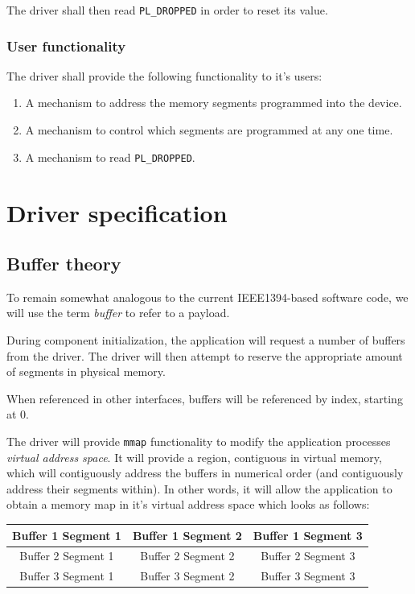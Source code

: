 \documentclass[12pt]{article}
\begin{document}
The driver shall then read \texttt{PL\_DROPPED} in order to reset its value.

\subsubsection{User functionality}

The driver shall provide the following functionality to it's users:

\begin{enumerate}
\item A mechanism to address the memory segments programmed into the device.
\item A mechanism to control which segments are programmed at any one time.
\item A mechanism to read \texttt{PL\_DROPPED}.
\end{enumerate}

\section{Driver specification}

\subsection{Buffer theory}

To remain somewhat analogous to the current IEEE1394-based software code, we will use the term \textit{buffer} to refer to a payload.

During component initialization, the application will request a number of buffers from the driver. The driver will then attempt to reserve the appropriate amount of segments in physical memory.

When referenced in other interfaces, buffers will be referenced by index, starting at 0.

The driver will provide \texttt{mmap} functionality to modify the application processes \textit{virtual address space}. It will provide a region, contiguous in virtual memory, which will contiguously address the buffers in numerical order (and contiguously address their segments within). In other words, it will allow the application to obtain a memory map in it's virtual address space which looks as follows:

\begin{tabular}{|c|c|c|}\hline
Buffer 1 Segment 1 & Buffer 1 Segment 2 & Buffer 1 Segment 3 \\ \hline
Buffer 2 Segment 1 & Buffer 2 Segment 2 & Buffer 2 Segment 3 \\ \hline
Buffer 3 Segment 1 & Buffer 3 Segment 2 & Buffer 3 Segment 3 \\ \hline
\end{tabular}
\end{document}
